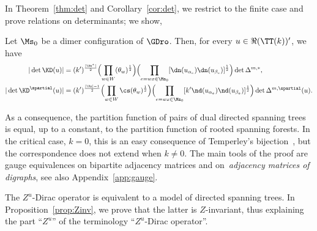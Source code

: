 \documentclass[a4paper,twoside,11pt]{article}
\begin{document}
In Theorem~\ref{thm:det} and Corollary~\ref{cor:det}, we restrict to the finite case and prove relations on determinants; we show,
\begin{thm}\label{thm:det_intro}
Let $\Ms_0$ be a dimer configuration of $\GDro$. 
Then, for every $u\in\Re(\TT(k))'$, we have
\begin{align*}
|\det\KD(u)|&=
(k')^{\frac{|\Vs^*|}{2}}\Bigl(\prod_{w\in W}\sc(\theta_w)^\frac{1}{2}\Bigr)
\Bigl(\prod_{e=wx\in\Ms_0} [\dn(u_{\alpha_e})\dn(u_{\beta_e})]^{\frac{1}{2}}  \Bigr)
\det \Delta^{m,*},\\
|\det\KD^\spartial(u)|&=
(k')^{\frac{|\Vs|-1}{2}}\Bigl(\prod_{w\in W}\cs(\theta_w)^\frac{1}{2}\Bigr)  
\Bigl(\prod_{e=wx\in\Ms_0} [k'\nd(u_{\alpha_e})\nd(u_{\beta_e})]^{\frac{1}{2}}  \Bigr)
\det\Delta^{m,\spartial}(u).
\end{align*}
\end{thm}
As a consequence, the partition function of pairs of dual directed spanning trees is equal, up to a constant, to the partition function of rooted spanning 
forests. In the critical case, $k=0$, this is an easy consequence of Temperley's bijection~\cite{Temperley}, but the correspondence does not extend 
when $k\neq 0$. The main tools of the proof are gauge equivalences on bipartite adjacency matrices and on~\emph{adjacency matrices of digraphs},
see also Appendix~\ref{app:gauge}. 

The $Z^u$-Dirac operator is equivalent to a model of directed spanning trees. In
Proposition~\ref{prop:Zinv}, we prove that the latter is $Z$-invariant, thus explaining the part ``$Z^u$'' of the 
terminology ``$Z^u$-Dirac operator''.
\end{document}
